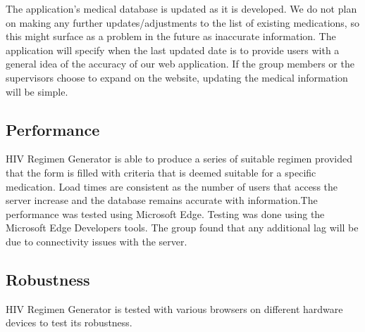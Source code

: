 \documentclass[12pt]{article}
\begin{document}
The application’s medical database is updated as it is developed. We do not plan on making any further updates/adjustments to the list of existing medications, so this might surface as a problem in the future as inaccurate information. The application will specify when the last updated date is to provide users with a general idea of the accuracy of our web application. If the group members or the supervisors choose to expand on the website, updating the medical information will be simple.

\subsection{Performance}
HIV Regimen Generator is able to produce a series of suitable regimen provided that the form is filled with criteria that is deemed suitable for a specific medication. Load times are consistent as the number of users that access the server increase and the database remains accurate with information.The performance was tested using Microsoft Edge. Testing was done using the Microsoft Edge Developers tools. The group found that any additional lag will be due to connectivity issues with the server.

\subsection{Robustness}
HIV Regimen Generator is tested with various browsers on different hardware devices to test its robustness.
\end{document}
